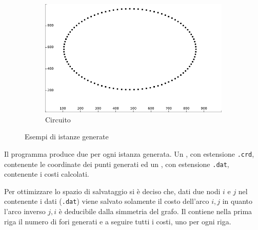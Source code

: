 \begin{figure}
\begin{subfigure}[b]{0.5\textwidth}
\includegraphics[width=\textwidth]{Images/Part_1/Instances/Circle.png}
\caption{Circuito}
\label{pt1:generator:Circle_img}
\end{subfigure}
\caption{Esempi di istanze generate}
\label{pt1:generator:imgs}
\end{figure}

Il programma produce due  per ogni istanza generata. Un , con estensione \texttt{.crd}, contenente le coordinate dei punti generati ed un , con estensione \texttt{.dat}, contenente i costi calcolati.

Per ottimizzare lo spazio di salvataggio si è deciso che, dati due nodi $i$ e $j$ nel  contenente i dati (\texttt{.dat}) viene salvato solamente il costo dell'arco $i,j$ in quanto l'arco inverso $j,i$ è deducibile dalla simmetria del grafo. Il  contiene nella prima riga il numero di fori generati e a seguire tutti i costi, uno per ogni riga.